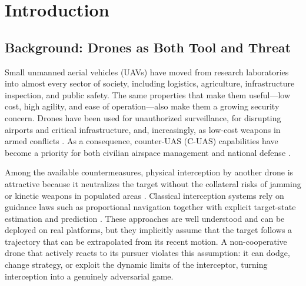 
\chapter{Introduction}

\section{Background: Drones as Both Tool and Threat}
\noindent
Small unmanned aerial vehicles (UAVs) have moved from research laboratories into almost every sector of society, including logistics, agriculture, infrastructure inspection, and public safety. The same properties that make them useful---low cost, high agility, and ease of operation---also make them a growing security concern. Drones have been used for unauthorized surveillance, for disrupting airports and critical infrastructure, and, increasingly, as low-cost weapons in armed conflicts \cite{chauhanNationsDefenseComprehensive2025}. As a consequence, counter-UAS (C-UAS) capabilities have become a priority for both civilian airspace management and national defense \cite{chauhanNationsDefenseComprehensive2025, palmasReinforcementLearningDecisionLevel2025}.

Among the available countermeasures, physical interception by another drone is attractive because it neutralizes the target without the collateral risks of jamming or kinetic weapons in populated areas \cite{lucotteInterceptionAdversarialDrones2026, vrbaAutonomousCaptureAgile2022}. Classical interception systems rely on guidance laws such as proportional navigation together with explicit target-state estimation and prediction \cite{pliskaSafeMidAirDrone2024, vrbaAutonomousCaptureAgile2022}. These approaches are well understood and can be deployed on real platforms, but they implicitly assume that the target follows a trajectory that can be extrapolated from its recent motion. A non-cooperative drone that actively reacts to its pursuer violates this assumption: it can dodge, change strategy, or exploit the dynamic limits of the interceptor, turning interception into a genuinely adversarial game.

